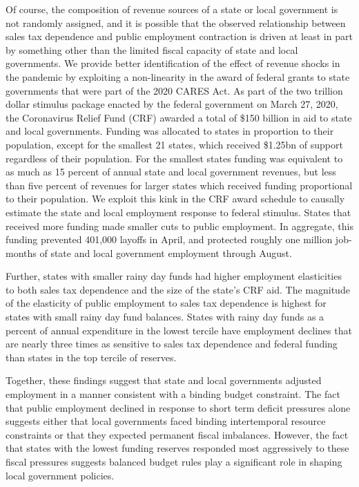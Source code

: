 Of course, the composition of revenue sources of a state or local government is not randomly assigned, and it is possible that the observed relationship between sales tax dependence and public employment contraction is driven at least in part by something other than the limited fiscal capacity of state and local governments. We provide better identification of the effect of revenue shocks in the pandemic by exploiting a non-linearity in the award of federal grants to state governments that were part of the 2020 CARES Act. As part of the two trillion dollar stimulus package enacted by the federal government on March 27, 2020, the Coronavirus Relief Fund (CRF) awarded a total of \$150 billion in aid to state and local governments. Funding was allocated to states in proportion to their population, except for the smallest 21 states, which received \$1.25bn of support regardless of their population. For the smallest states funding was equivalent to as much as 15 percent of annual state and local government revenues, but less than five percent of revenues for larger states which received funding proportional to their population. We exploit this kink in the CRF award schedule to causally estimate the state and local employment response to federal stimulus. States that received more funding made smaller cuts to public employment. In aggregate, this funding prevented 401,000 layoffs in April, and protected roughly one million job-months of state and local government employment through August.

Further, states with smaller rainy day funds had higher employment elasticities to both sales tax dependence and the size of the state’s CRF aid. 
The magnitude of the elasticity of public employment to sales tax dependence is highest for states with small rainy day fund balances. 
States with rainy day funds as a percent of annual expenditure in the lowest tercile have employment declines that are nearly three times as sensitive to sales tax dependence and federal funding than states in the top tercile of reserves. 

Together, these findings suggest that state and local governments adjusted employment in a manner consistent with a binding budget constraint. 
The fact that public employment declined in response to short term deficit pressures alone suggests either that local governments faced binding intertemporal resource constraints or that they expected permanent fiscal imbalances. However, the fact that states with the lowest funding reserves responded most aggressively to these fiscal pressures suggests balanced budget rules play a significant role in shaping local government policies. 

